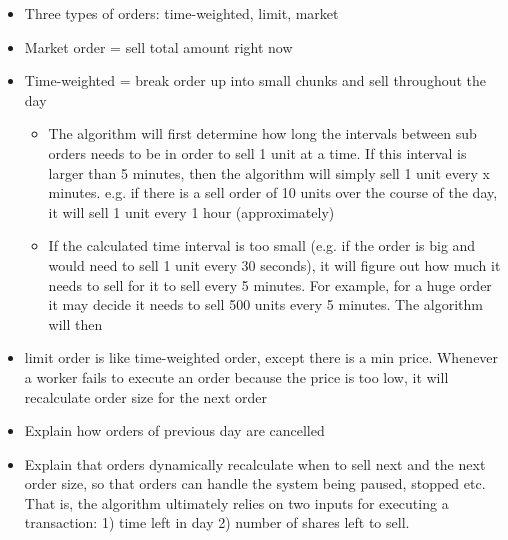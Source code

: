 \documentclass{article}
\begin{document}
\begin{itemize}
\item Three types of orders: time-weighted, limit, market
\item Market order = sell total amount right now
\item Time-weighted = break order up into small chunks and sell throughout the day
\begin{itemize}
\item The algorithm will first determine how long the intervals between sub orders needs to be in order to sell 1 unit at a time. If this interval is larger than 5 minutes, then the algorithm will simply sell 1 unit every x minutes. e.g. if there is a sell order of 10 units over the course of the day, it will sell 1 unit every 1 hour (approximately)
\item If the calculated time interval is too small (e.g. if the order is big and would need to sell 1 unit every 30 seconds), it will figure out how much it needs to sell for it to sell every 5 minutes. For example, for a huge order it may decide it needs to sell 500 units every 5 minutes. The algorithm will then 
\end{itemize}
\item limit order is like time-weighted order, except there is a min price. Whenever a worker fails to execute an order because the price is too low, it will recalculate order size for the next order  
\item Explain how orders of previous day are cancelled
\item Explain that orders dynamically recalculate when to sell next and the next order size, so that orders can handle the system being paused, stopped etc. That is, the algorithm ultimately relies on two inputs for executing a transaction: 1) time left in day 2) number of shares left to sell.  
\end{itemize}
\end{document}
